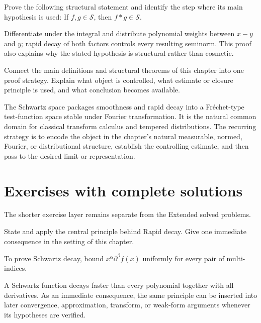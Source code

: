 \begin{problem}\label{prob:iii14-problem-11}
Prove the following structural statement and identify the step where its main hypothesis is used: If $f,g\in\mathcal S$, then $f*g\in\mathcal S$.
\end{problem}
\begin{solution}
Differentiate under the integral and distribute polynomial weights between $x-y$ and $y$; rapid decay of both factors controls every resulting seminorm. This proof also explains why the stated hypothesis is structural rather than cosmetic.
\end{solution}

\begin{problem}\label{prob:iii14-problem-12}
Connect the main definitions and structural theorems of this chapter into one proof strategy. Explain what object is controlled, what estimate or closure principle is used, and what conclusion becomes available.
\end{problem}
\begin{solution}
The Schwartz space packages smoothness and rapid decay into a Fréchet-type test-function space stable under Fourier transformation. It is the natural common domain for classical transform calculus and tempered distributions. The recurring strategy is to encode the object in the chapter's natural measurable, normed, Fourier, or distributional structure, establish the controlling estimate, and then pass to the desired limit or representation.
\end{solution}
\section{Exercises with complete solutions}
The shorter exercise layer remains separate from the Extended solved problems.

\begin{exercise}\label{exr:iii14-01}
State and apply the central principle behind Rapid decay. Give one immediate consequence in the setting of this chapter.
\end{exercise}
\begin{hint}
To prove Schwartz decay, bound \(x^\alpha\partial^\beta f(x)\) uniformly for every pair of multi-indices.
\end{hint}
\begin{solution}
A Schwartz function decays faster than every polynomial together with all derivatives. As an immediate consequence, the same principle can be inserted into later convergence, approximation, transform, or weak-form arguments whenever its hypotheses are verified.
\end{solution}

